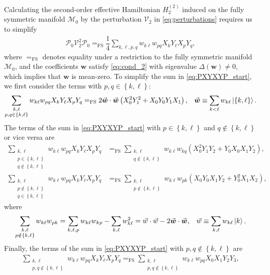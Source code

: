 \documentclass[nofootinbib,notitlepage,11pt]{revtex4-2}
\newcommand{\f}[2]{\dfrac{#1}{#2}} %
\newcommand{\p}[1]{\left(#1\right)} %
\renewcommand{\set}[1]{\left\{#1\right\}} %
\renewcommand{\c}{\cdot} %
\newcommand{\m}{\bm} %
\renewcommand{\v}{\vec} %
\newcommand{\1}{\mathds{1}}
\newcommand{\M}{\mathcal{M}}
\renewcommand{\P}{\mathcal{P}}
\newcommand{\V}{\mathcal{V}}
\newcommand{\EQFS}{=_{\text{FS}}}
\begin{document}
Calculating the second-order effective Hamiltonian $H_2^{(2)}$ induced
on the fully symmetric manifold $\M_0$ by the perturbation $\V_2$ in
\eqref{eq:perturbations} requires us to simplify
\begin{align}
  \P_0 \V_2^2 \P_0
  \EQFS \f14 \sum_{k,\ell,p,q}
  w_{k\ell} w_{pq} X_k Y_\ell X_p Y_q,
  \label{eq:PXYXYP_start}
\end{align}
where $\EQFS$ denotes equality under a restriction to the fully
symmetric manifold $\M_0$, and the coefficients $\m w$ satisfy
\eqref{eq:cond_2} with eigenvalue $\Delta\p{\m w}\ne0$, which implies
that $\m w$ is mean-zero.  To simplify the sum in
\eqref{eq:PXYXYP_start}, we first consider the terms with
$p,q\in\set{k,\ell}$:
\begin{align}
  \sum_{\substack{k,\ell\\p,q\in\set{k,\ell}}}
  w_{k\ell} w_{pq} X_k Y_\ell X_p Y_q
  \EQFS 2 \v{\m w}\c\v{\m w} \p{X_0^2 Y_1^2 + X_0 Y_0 Y_1 X_1},
  &&
  \v{\m w} \equiv \sum_{k<\ell} w_{k\ell} \ket{\set{k,\ell}}.
\end{align}
The terms of the sum in \eqref{eq:PXYXYP_start} with
$p\in\set{k,\ell}$ and $q\notin\set{k,\ell}$ or vice versa are
\begin{align}
  \sum_{\substack{k,\ell\\p\in\set{k,\ell}\\q\notin\set{k,\ell}}}
  w_{k\ell} w_{pq} X_k Y_\ell X_p Y_q
  &\EQFS \sum_{\substack{k,\ell\\q\notin\set{k,\ell}}}
  w_{k\ell} w_{k q} \p{X_0^2 Y_1 Y_2 + Y_0 X_0 X_1 Y_2}, \\
  \sum_{\substack{k,\ell\\p\notin\set{k,\ell}\\q\in\set{k,\ell}}}
  w_{k\ell} w_{pq} X_k Y_\ell X_p Y_q
  &\EQFS \sum_{\substack{k,\ell\\p\notin\set{k,\ell}}}
  w_{k\ell} w_{pk} \p{X_0 Y_0 X_1 Y_2 + Y_0^2 X_1 X_2},
\end{align}
where
\begin{align}
  \sum_{\substack{k,\ell\\p\notin\set{k,\ell}}} w_{k\ell} w_{pk}
  = \sum_{k,\ell,p} w_{k\ell} w_{kp} - \sum_{k,\ell} w_{k\ell}^2
  = \v w\c\v w - 2 \v{\m w}\c\v{\m w},
  &&
  \v w \equiv \sum_{k,\ell} w_{k\ell} \ket{k}.
\end{align}
Finally, the terms of the sum in \eqref{eq:PXYXYP_start} with
$p,q\notin\set{k,\ell}$ are
\begin{align}
  \sum_{\substack{k,\ell\\p,q\notin\set{k,\ell}}}
  w_{k\ell} w_{pq} X_k Y_\ell X_p Y_q
  \EQFS \sum_{\substack{k,\ell\\p,q\notin\set{k,\ell}}}
  w_{k\ell} w_{pq} X_0 X_1 Y_2 Y_3,
\end{align}
\end{document}
